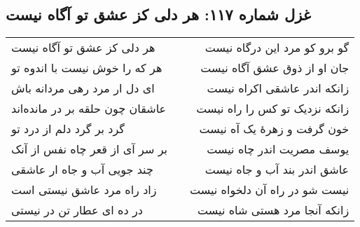 \begin{center}
\section*{غزل شماره ۱۱۷: هر دلی کز عشق تو آگاه نیست}
\label{sec:117}
\begin{longtable}{l p{0.5cm} r}
هر دلی کز عشق تو آگاه نیست
&&
گو برو کو مرد این درگاه نیست
\\
هر که را خوش نیست با اندوه تو
&&
جان او از ذوق عشق آگاه نیست
\\
ای دل ار مرد رهی مردانه باش
&&
زانکه اندر عاشقی اکراه نیست
\\
عاشقان چون حلقه بر در مانده‌اند
&&
زانکه نزدیک تو کس را راه نیست
\\
گرد بر گرد دلم از درد تو
&&
خون گرفت و زهرهٔ یک آه نیست
\\
بر سر آی از قعر چاه نفس از آنک
&&
یوسف مصریت اندر چاه نیست
\\
چند جویی آب و جاه ار عاشقی
&&
عاشق اندر بند آب و جاه نیست
\\
زاد راه مرد عاشق نیستی است
&&
نیست شو در راه آن دلخواه نیست
\\
در ده ای عطار تن در نیستی
&&
زانکه آنجا مرد هستی شاه نیست
\\
\end{longtable}
\end{center}
